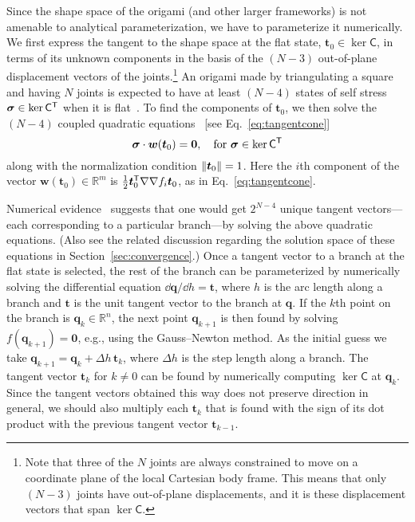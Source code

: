 Since the shape space of the origami (and other larger frameworks) is not amenable to analytical parameterization, we have to parameterize it numerically.
We first express the tangent to the shape space at the flat state, $\bm{t}_{0} \in \ker \mathsf{C}$, in terms of its unknown components in the basis of the $(N - 3)$ out-of-plane displacement vectors of the joints.\footnote{Note that three of the $N$ joints are always constrained to move on a coordinate plane of the local Cartesian body frame.  This means that only $(N - 3)$ joints have out-of-plane displacements, and it is these displacement vectors that span $\ker\mathsf{C}$.}
An origami made by triangulating a square and having $N$ joints is expected to have at least $(N - 4)$ states of self stress $\bm{\sigma} \in \ker\mathsf{C}^\mathsf{T}$ when it is flat~\cite{chen2018}.
To find the components of $\bm{t}_{0}$, we then solve the $(N - 4)$ coupled quadratic equations~\cite{tarnai2001,chen2018} [see Eq.~\eqref{eq:tangentcone}]
%
\begin{equation}
  \bm{\sigma}\cdot\bm{w}(\bm{t}_{0}) = \bm{0},\quad \text{for } \bm{\sigma} \in \ker{\mathsf{C}\ensuremath{^\mathsf{T}}}
  \label{eq:quadratic}
\end{equation}
%
along with the normalization condition $\lVert\bm{t}_{0}\rVert = 1$.
Here the $i$th component of the vector $\bm{w}(\bm{t}_{0}) \in \mathbb{R}^{m}$ is $\frac{1}{2}\bm{t}_{0}^\mathsf{T} \nabla\nabla f_{i} \bm{t}_{0}$, as in Eq.~\eqref{eq:tangentcone}. %

Numerical evidence~\cite{chen2018} suggests that one would get $2^{N-4}$ unique tangent vectors---each corresponding to a particular branch---by solving the above quadratic equations.
(Also see the related discussion regarding the solution space of these equations in Section~\ref{sec:convergence}.)
Once a tangent vector to a branch at the flat state is selected, the rest of the branch can be parameterized by numerically solving the differential equation $\dd\bm{q}/\dd{h} = \bm{t}$, where $h$ is the arc length along a branch and $\bm{t}$ is the unit tangent vector to the branch at $\bm{q}$.
If the $k$th point on the branch is $\bm{q}_k \in \mathbb{R}^{n}$, the next point $\bm{q}_{k+1}$ is then found by solving $f(\bm{q}_{k+1}) = \bm{0}$, e.g., using the Gauss--Newton method.
As the initial guess we take $\bm{q}_{k+1} = \bm{q}_{k} + \Delta h\,\bm{t}_{k}$, where $\Delta h$ is the step length along a branch.
The tangent vector $\bm{t}_k$ for $k \ne 0$ can be found by numerically computing $\ker\mathsf{C}$ at $\bm{q}_k$.
Since the tangent vectors obtained this way does not preserve direction in general, we should also multiply each $\bm{t}_k$ that is found with the sign of its dot product with the previous tangent vector $\bm{t}_{k-1}$.

